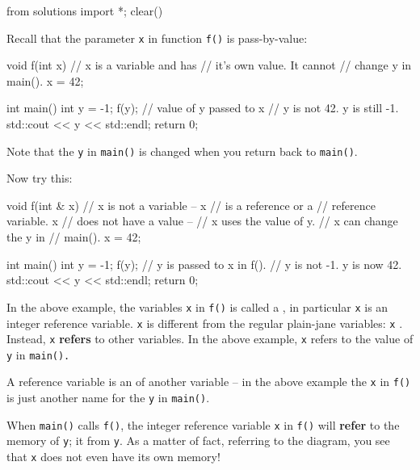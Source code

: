 \begin{python0}
from solutions import *; clear()
\end{python0}

Recall that the parameter \texttt{x} in function \texttt{f()} is pass-by-value:

\begin{consolethree}[escapeinside=||]
void f(int x) // x is a variable and has
              // it's own value. It cannot
              // change y in main().
{
    x = 42;
}

int main()
{
    int y = -1;
    f(y); // value of y passed to x
    // y is not 42. y is still -1.
    std::cout << y << std::endl;
    return 0;
}
\end{consolethree}

Note that the \texttt{y} in \texttt{main()} is  changed when you return back to \texttt{main()}.

Now try this:

\begin{consolethree}[escapeinside=||]
void f(int & x) // x is not a variable -- x
                // is a reference or a
                // reference variable. x
                // does not have a value --
                // x uses the value of y.
                // x can change the y in
                // main().
{
    x = 42;
}

int main()
{
    int y = -1;
    f(y); // y is passed to x in f().
    // y is not -1. y is now 42.
    std::cout << y << std::endl;
    return 0;
}
\end{consolethree}

In the above example, the variables \texttt{x} in \texttt{f()} is called a , in particular \texttt{x} is an integer reference variable. \texttt{x} is different from the regular plain-jane variables: \texttt{x} . Instead, \texttt{x} \textbf{refers} to other variables. In the above example, \texttt{x} refers to the value of \texttt{y} in \texttt{main().}

A reference variable is an  of another variable -- in the above example the \texttt{x} in \texttt{f()} is just another name for the \texttt{y} in \texttt{main()}.

When \texttt{main()} calls \texttt{f()}, the integer reference variable \texttt{x} in \texttt{f()} will \textbf{refer} to the memory of \texttt{y}; it  from \texttt{y}. As a matter of fact, referring to the diagram, you see that \texttt{x} does not even have its own memory!

